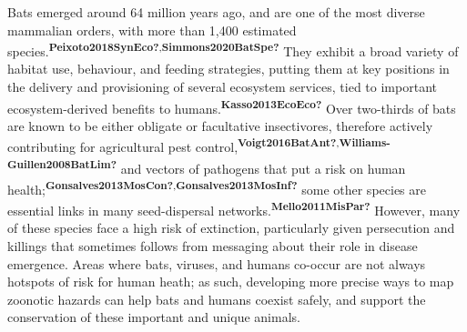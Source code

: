 \documentclass[10pt,oneside]{article}
\begin{document}
Bats emerged around 64 million years ago, and are one of the most
diverse mammalian orders, with more than 1,400 estimated
species.\textsuperscript{\textbf{Peixoto2018SynEco?},\textbf{Simmons2020BatSpe?}}
They exhibit a broad variety of habitat use, behaviour, and feeding
strategies, putting them at key positions in the delivery and
provisioning of several ecosystem services, tied to important
ecosystem-derived benefits to
humans.\textsuperscript{\textbf{Kasso2013EcoEco?}} Over two-thirds of
bats are known to be either obligate or facultative insectivores,
therefore actively contributing for agricultural pest
control,\textsuperscript{\textbf{Voigt2016BatAnt?},\textbf{Williams-Guillen2008BatLim?}}
and vectors of pathogens that put a risk on human
health;\textsuperscript{\textbf{Gonsalves2013MosCon?},\textbf{Gonsalves2013MosInf?}}
some other species are essential links in many seed-dispersal
networks.\textsuperscript{\textbf{Mello2011MisPar?}} However, many of
these species face a high risk of extinction, particularly given
persecution and killings that sometimes follows from messaging about
their role in disease emergence. Areas where bats, viruses, and humans
co-occur are not always hotspots of risk for human heath; as such,
developing more precise ways to map zoonotic hazards can help bats and
humans coexist safely, and support the conservation of these important
and unique animals.
\end{document}
